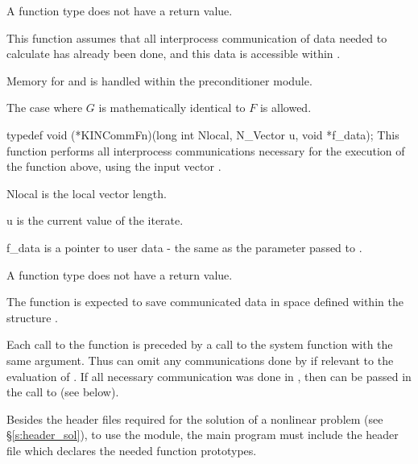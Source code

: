 {
  A  function type does not have a return value.
}
{
  This function assumes that all interprocess communication of data needed to 
  calculate  has already been done, and this data is accessible within
  .

   Memory for  and  is handled within the preconditioner module.

  The case where $G$ is mathematically identical to $F$ is allowed.
}
{
  typedef void (*KINCommFn)(long int Nlocal, N\_Vector u, void *f\_data);
}
{
  This function performs all interprocess communications necessary 
  for the execution of the  function above, using the input vector .
}
{
  \begin{args}[Nlocal]
  \item[Nlocal] 
    is the local vector length.
  \item[u]
    is the current value of the iterate.
  \item[f\_data]
    is a pointer to user data - the same as the       
    parameter passed to .  
  \end{args}
}
{
  A  function type does not have a return value.
}
{
  The  function is expected to save communicated data in space defined
  within the structure . 

  Each call to the  function is preceded by a call to the system function
   with the same  argument.  Thus  can omit 
  any communications done by  if relevant to the evaluation of .
  If all necessary communication was done in , then 
  can be passed in the call to  (see below).
}

Besides the header files required for the solution of a nonlinear problem
(see \S\ref{s:header_sol}),  to use the {\kinbbdpre} module, the main program 
must include the header file  which declares the needed
function prototypes.

